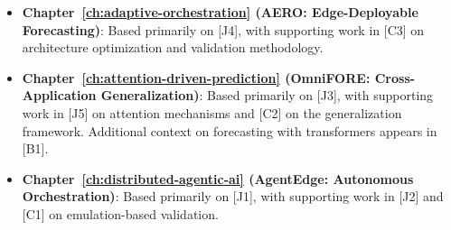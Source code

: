 \begin{itemize}
    \item \textbf{Chapter~\ref{ch:adaptive-orchestration} (\ac{AERO}: Edge-Deployable Forecasting)}: Based primarily on [J4], with supporting work in [C3] on architecture optimization and validation methodology.
    
    \item \textbf{Chapter~\ref{ch:attention-driven-prediction} (\ac{OmniFORE}: Cross-Application Generalization)}: Based primarily on [J3], with supporting work in [J5] on attention mechanisms and [C2] on the generalization framework. Additional context on forecasting with transformers appears in [B1].
    
    \item \textbf{Chapter~\ref{ch:distributed-agentic-ai} (\ac{AgentEdge}: Autonomous Orchestration)}: Based primarily on [J1], with supporting work in [J2] and [C1] on emulation-based validation.
\end{itemize}

